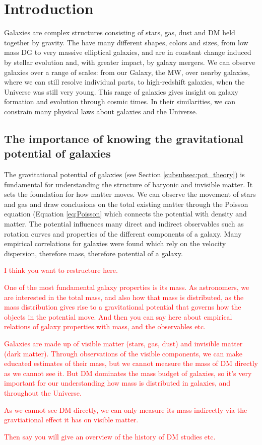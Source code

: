 \section{Introduction}\label{sec:Intro}
Galaxies are complex structures consisting of stars, gas, dust and \ac{DM} held together by gravity. The have many different shapes, colors and sizes, from low mass \ac{DG} to very massive elliptical galaxies, and are in constant change induced by stellar evolution and, with greater impact, by galaxy mergers. We can observe galaxies over a range of scales: from our Galaxy, the \ac{MW}, over nearby galaxies, where we can still resolve individual parts, to high-redshift galaxies, when the Universe was still very young. This range of galaxies gives insight on galaxy formation and evolution through cosmic times. In their similarities, we can constrain many physical laws about galaxies and the Universe. 

\subsection{The importance of knowing the gravitational potential of galaxies}
The gravitational potential of galaxies (see Section \ref{subsubsec:pot_theory}) is fundamental for understanding the structure of baryonic and invisible matter. It sets the foundation for how matter moves. We can observe the movement of stars and gas and draw conclusions on the total existing matter through the Poisson equation (Equation \ref{eq:Poisson} which connects the potential with density and matter. The potential influences many direct and indirect observables such as rotation curves and properties of the different components of a galaxy. Many empirical correlations for galaxies were found which rely on the velocity dispersion, therefore mass, therefore potential of a galaxy. 

\textcolor{red}{I think you want to restructure here.

One of the most fundamental galaxy properties is its mass. As astronomers, we are interested in the total mass, and also how that mass is distributed, as the mass distribution gives rise to a gravitational potential that governs how the objects in the potential move. And then you can say here about empirical relations of galaxy properties with mass, and the observables etc.

Galaxies are made up of visible matter (stars, gas, dust) and invisible matter (dark matter). Through observations of the visible components, we can make educated estimates of their mass, but we cannot measure the mass of DM directly as we cannot see it. But DM dominates the mass budget of galaxies, so it's very important for our understanding how mass is distributed in galaxies, and throughout the Universe.

As we cannot see DM directly, we can only measure its mass indirectly via the gravtiational effect it has on visible matter.

Then say you will give an overview of the history of DM studies etc.}

